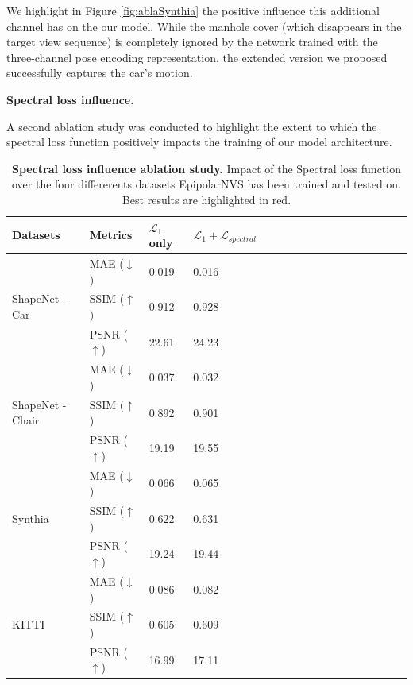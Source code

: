 We highlight in Figure \ref{fig:ablaSynthia} the positive influence this additional channel has on the our model. While the manhole cover (which disappears in the target view sequence) is completely  ignored by the network trained with the three-channel pose encoding representation, the extended version we proposed successfully captures the car's motion.\newline 

\textbf{Spectral loss influence.}

A second ablation study was conducted to highlight the extent to which the spectral loss function positively impacts the training of our model architecture. 
\begin{table}[h!]
    \caption{\textbf{Spectral loss influence ablation study.} Impact of the Spectral loss function over the four differerents datasets EpipolarNVS has been trained and tested on.  Best results are highlighted in \colorbox{red!25}{red}.}
    \label{tab:spectral}
\begin{center}
\begin{tabular}{@{}||lllllllllllllllll@{}}
  \toprule
  Datasets & Metrics  &$\mathcal{L}_{1}$ only  &  $\mathcal{L}_{1}+\mathcal{L}_{spectral}$ &   \\
  \midrule
  \multirow{3}{*}{ShapeNet - Car \citep{chang2015shapenet}} & MAE ($\downarrow$) &\hfil 0.019 & \hfil  \cellcolor{red!25}0.016 \\
  & SSIM ($\uparrow$) & \hfil0.912 &  \cellcolor{red!25}0.928\\
  & PSNR ($\uparrow$)& \hfil22.61 & \hfil \cellcolor{red!25}24.23\\
  \midrule
  \multirow{3}{*}{ShapeNet - Chair \citep{chang2015shapenet}} & MAE ($\downarrow$) & \hfil 0.037 & \hfil \cellcolor{red!25}0.032\\
  & SSIM ($\uparrow$)&\hfil 0.892 & \hfil \cellcolor{red!25}0.901 \\
  & PSNR ($\uparrow$) & \hfil 19.19 & \hfil \cellcolor{red!25}19.55 \\
  \midrule
  \multirow{3}{*}{Synthia \citep{ros2016synthia}} & MAE ($\downarrow$)& \hfil 0.066 & \hfil \cellcolor{red!25}0.065\\
  & SSIM ($\uparrow$)& \hfil 0.622 & \hfil \cellcolor{red!25}0.631 \\
  & PSNR ($\uparrow$)& \hfil 19.24 & \hfil \cellcolor{red!25}19.44\\
  \midrule
  \multirow{3}{*}{KITTI \citep{geiger2012we}} & MAE ($\downarrow$)& \hfil 0.086 & \hfil \cellcolor{red!25}0.082\\
  & SSIM ($\uparrow$)& \hfil 0.605 & \hfil \cellcolor{red!25}0.609 \\
  & PSNR ($\uparrow$)& \hfil 16.99 & \hfil \cellcolor{red!25}17.11\\\hline
\end{tabular}
\end{center}
\end{table}

